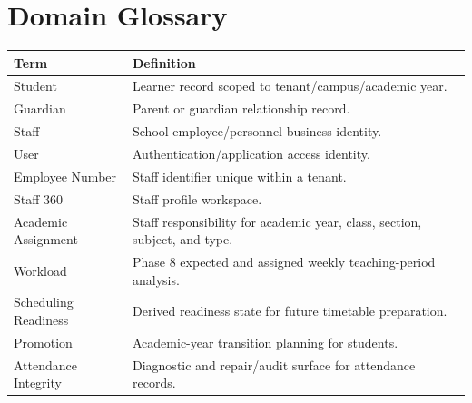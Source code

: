 \chapter{Domain Glossary}
\label{app:glossary}
\begin{longtable}{@{}p{}p{}@{}}
\toprule
\textbf{Term} & \textbf{Definition}\\
\midrule
Student & Learner record scoped to tenant/campus/academic year.\\
Guardian & Parent or guardian relationship record.\\
Staff & School employee/personnel business identity.\\
User & Authentication/application access identity.\\
Employee Number & Staff identifier unique within a tenant.\\
Staff 360 & Staff profile workspace.\\
Academic Assignment & Staff responsibility for academic year, class, section, subject, and type.\\
Workload & Phase 8 expected and assigned weekly teaching-period analysis.\\
Scheduling Readiness & Derived readiness state for future timetable preparation.\\
Promotion & Academic-year transition planning for students.\\
Attendance Integrity & Diagnostic and repair/audit surface for attendance records.\\
\bottomrule
\end{longtable}
